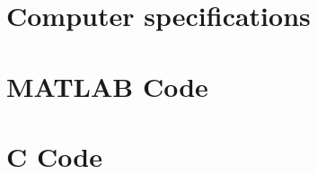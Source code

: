 \appendix

\chapter{Computer specifications}
\label{apdx:computerSpecifications}


\chapter{MATLAB Code}
\label{apdx:matlabCode}


\chapter{C Code}
\label{apdx:cCode}

